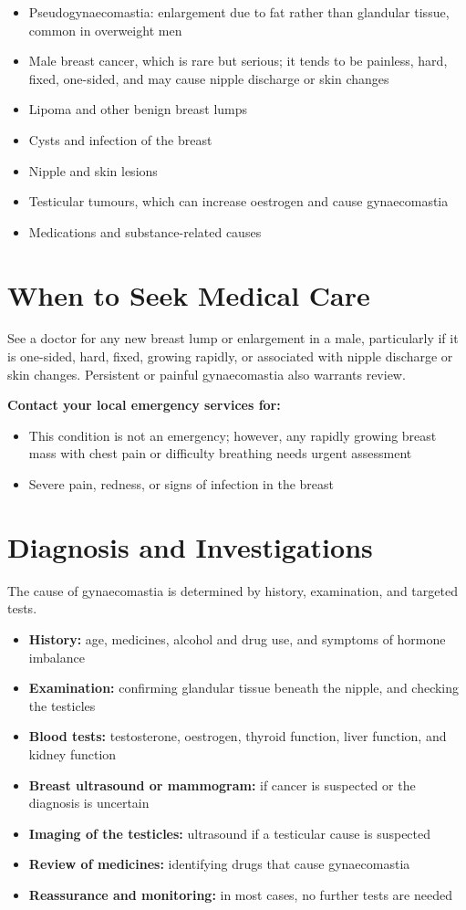 \begin{itemize}
    \item Pseudogynaecomastia: enlargement due to fat rather than glandular tissue, common in overweight men
    \item Male breast cancer, which is rare but serious; it tends to be painless, hard, fixed, one-sided, and may cause nipple discharge or skin changes
    \item Lipoma and other benign breast lumps
    \item Cysts and infection of the breast
    \item Nipple and skin lesions
    \item Testicular tumours, which can increase oestrogen and cause gynaecomastia
    \item Medications and substance-related causes
\end{itemize}

\section*{When to Seek Medical Care}
See a doctor for any new breast lump or enlargement in a male, particularly if it is one-sided, hard, fixed, growing rapidly, or associated with nipple discharge or skin changes. Persistent or painful gynaecomastia also warrants review.

\textbf{Contact your local emergency services for:}
\begin{itemize}
    \item This condition is not an emergency; however, any rapidly growing breast mass with chest pain or difficulty breathing needs urgent assessment
    \item Severe pain, redness, or signs of infection in the breast
\end{itemize}

\section*{Diagnosis and Investigations}
The cause of gynaecomastia is determined by history, examination, and targeted tests.

\begin{itemize}
    \item \textbf{History:} age, medicines, alcohol and drug use, and symptoms of hormone imbalance
    \item \textbf{Examination:} confirming glandular tissue beneath the nipple, and checking the testicles
    \item \textbf{Blood tests:} testosterone, oestrogen, thyroid function, liver function, and kidney function
    \item \textbf{Breast ultrasound or mammogram:} if cancer is suspected or the diagnosis is uncertain
    \item \textbf{Imaging of the testicles:} ultrasound if a testicular cause is suspected
    \item \textbf{Review of medicines:} identifying drugs that cause gynaecomastia
    \item \textbf{Reassurance and monitoring:} in most cases, no further tests are needed
\end{itemize}

